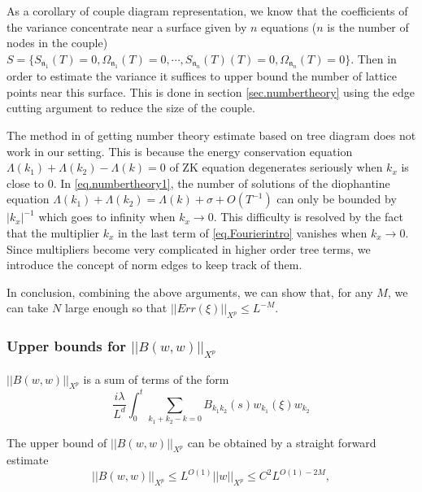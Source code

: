 As a corollary of couple diagram representation, we know that the coefficients of the variance concentrate near a surface given by $n$ equations ($n$ is the number of nodes in the couple) $S=\{S_{\mathfrak{n}_1}(T)=0,\Omega_{\mathfrak{n}_1}(T)=0,\cdots,S_{\mathfrak{n}_{n}}(T)(T)=0,\Omega_{\mathfrak{n}_n}(T)=0\}$. Then in order to estimate the variance it suffices to upper bound the number of lattice points near this surface. This is done in section \ref{sec.numbertheory} using the edge cutting argument to reduce the size of the couple. 

The method in \cite{DH} of getting number theory estimate based on tree diagram does not work in our setting. This is because the energy conservation equation $\Lambda(k_1)+\Lambda(k_2)-\Lambda(k)=0$ of ZK equation degenerates seriously when $k_{x}$ is close to $0$. In \eqref{eq.numbertheory1}, the number of solutions of the diophantine equation $\Lambda(k_1)+\Lambda(k_2)=\Lambda(k)+\sigma+O(T^{-1})$ can only be bounded by $|k_x|^{-1}$ which goes to infinity when $k_{x}\rightarrow 0$. This difficulty is resolved by the fact that the multiplier $k_x$ in the last term of \eqref{eq.Fourierintro} vanishes when $k_{x}\rightarrow 0$. Since multipliers become very complicated in higher order tree terms, we introduce the concept of norm edges to keep track of them. 

In conclusion, combining the above arguments, we can show that, for any $M$, we can take $N$ large enough so that $||Err(\xi)||_{X^p}\le L^{-M}$.





\subsubsection{Upper bounds for $||B(w,w)||_{X^p}$} $||B(w,w)||_{X^p}$ is a sum of terms of the form
\begin{equation}
    \frac{i\lambda}{L^{d}} \int^{t}_0\sum_{k_1+k_2-k=0} B_{k_1k_2}(s)  w_{k_1}(\xi)w_{k_2}
\end{equation}

The upper bound of $||B(w,w)||_{X^p}$ can be obtained by a straight forward estimate
\begin{equation}
||B(w,w)||_{X^p}\le L^{O(1)} ||w||_{X^p} \le C^2 L^{O(1)-2M},
\end{equation}

